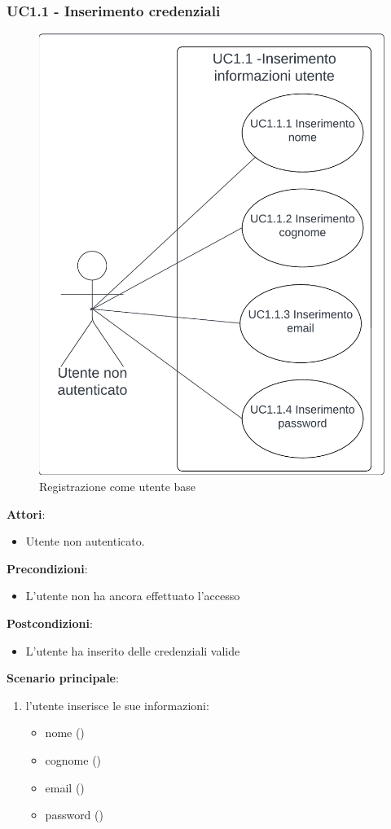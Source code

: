 \subsubsection{UC1.1 - Inserimento credenziali}\label{usecase:1_1}
\begin{figure}[H]
  \centering
  \includegraphics[width=0.4\linewidth]{ucd/UCD1.1.png}
\caption{Registrazione come utente base}
\end{figure}
\textbf{Attori}:
\begin{itemize}
    \item Utente non autenticato.
\end{itemize}
\textbf{Precondizioni}:
\begin{itemize}
    \item L'utente non ha ancora effettuato l'accesso
\end{itemize}
\textbf{Postcondizioni}:
\begin{itemize}
    \item L'utente ha inserito delle credenziali valide
\end{itemize}
\textbf{Scenario principale}:
\begin{enumerate}
    \item l'utente inserisce le sue informazioni:
    \begin{itemize}
        \item nome ()
        \item cognome ()
        \item email ()
        \item password ()
    \end{itemize}
\end{enumerate}


